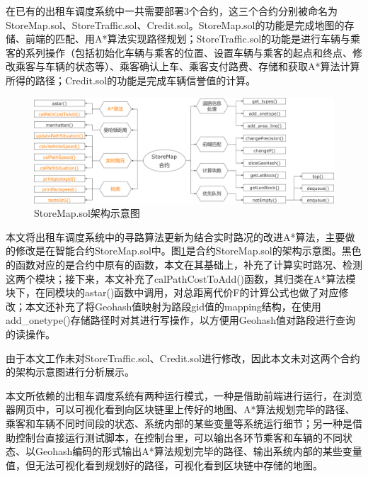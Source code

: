 在已有的出租车调度系统中一共需要部署3个合约，这三个合约分别被命名为StoreMap.sol、StoreTraffic.sol、Credit.sol。StoreMap.sol的功能是完成地图的存储、前端的匹配、用A*算法实现路径规划；StoreTraffic.sol的功能是进行车辆与乘客的系列操作（包括初始化车辆与乘客的位置、设置车辆与乘客的起点和终点、修改乘客与车辆的状态等）、乘客确认上车、乘客支付路费、存储和获取A*算法计算所得的路径；Credit.sol的功能是完成车辆信誉值的计算。

\begin{figure}[ht]
  \centering
  \includegraphics[width=1\textwidth]{undergraduate-thesis/images/StoreMapContract.png}
  \caption{StoreMap.sol架构示意图}
  \label{SMContract} %
\end{figure}

本文将出租车调度系统中的寻路算法更新为结合实时路况的改进A*算法，主要做的修改是在智能合约StoreMap.sol中。图\ref{SMContract}是合约StoreMap.sol的架构示意图。黑色的函数对应的是合约中原有的函数，本文在其基础上，补充了计算实时路况、检测这两个模块；接下来，本文补充了calPathCostToAdd()函数，其归类在A*算法模块下，在同模块的astar()函数中调用，对总距离代价F的计算公式也做了对应修改；本文还补充了将Geohash值映射为路段gid值的mapping结构，在使用add\_onetype()存储路径时对其进行写操作，以方便用Geohash值对路段进行查询的读操作。

由于本文工作未对StoreTraffic.sol、Credit.sol进行修改，因此本文未对这两个合约的架构示意图进行分析展示。

本文所依赖的出租车调度系统有两种运行模式，一种是借助前端进行运行，在浏览器网页中，可以可视化看到向区块链里上传好的地图、A*算法规划完毕的路径、乘客和车辆不同时间段的状态、系统内部的某些变量等系统运行细节；另一种是借助控制台直接运行测试脚本，在控制台里，可以输出各环节乘客和车辆的不同状态、以Geohash编码的形式输出A*算法规划完毕的路径、输出系统内部的某些变量值，但无法可视化看到规划好的路径，可视化看到区块链中存储的地图。

